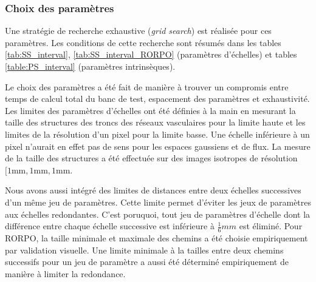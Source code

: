   \subsubsection{Choix des paramètres}

Une stratégie de recherche exhaustive (\textit{grid search}) est réalisée pour ces paramètres. Les conditions de cette recherche sont résumés dans les tables \ref{tab:SS_interval}, \ref{tab:SS_interval_RORPO} (paramètres d'échelles) et tables \ref{table:PS_interval} (paramètres intrinsèques).

Le choix des paramètres a été fait de manière à trouver un compromis entre temps de calcul total du banc de test, espacement des paramètres et exhaustivité. Les limites des paramètres d'échelles ont été définies à la main en mesurant la taille des structures des troncs des réseaux vasculaires pour la limite haute et les limites de la résolution d'un pixel pour la limite basse. Une échelle inférieure à un pixel n'aurait en effet pas de sens pour les espaces gaussiens et de flux. La mesure de la taille des structures a été effectuée sur des images isotropes de résolution $[1\textrm{mm},1\textrm{mm},1\textrm{mm}$. 

Nous avons aussi intégré des limites de distances entre deux échelles successives d'un même jeu de paramètres. Cette limite permet d'éviter les jeux de paramètres aux échelles redondantes. C'est poruquoi, tout jeu de paramètres d'échelle dont la différence entre chaque échelle successive est inférieure à $\frac{1}{6}mm$ est éliminé. Pour RORPO, la taille minimale et maximale des chemins a été choisie empiriquement par validation visuelle. Une limite minimale à la tailles entre deux chemins successifs pour un jeu de paramètre a aussi été déterminé empiriquement de manière à limiter la redondance.

